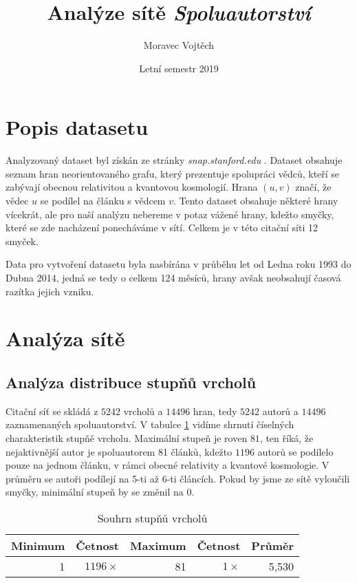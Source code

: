 \documentclass[a4paper,12pt]{article}
\author{Moravec Vojtěch}
\title{Analýze sítě \emph{Spoluautorství}}
\date{Letní semestr 2019}
\begin{document}
\maketitle
\newpage

\section{Popis datasetu}

Analyzovaný dataset byl získán ze stránky \emph{snap.stanford.edu} \cite{snapnets}. 
Dataset obsahuje seznam hran neorientovaného grafu, který prezentuje spolupráci vědců, kteří se zabývají obecnou relativitou a kvantovou kosmologií.
Hrana $(u,v)$ značí, že vědec $u$ se podílel na článku s vědcem $v$. Tento dataset obsahuje některé hrany vícekrát, ale pro naší analýzu nebereme v potaz
vážené hrany, kdežto smyčky, které se zde nacházení ponecháváme v sítí. Celkem je v této citační síti 12 smyček.

Data pro vytvoření datasetu byla nasbírána v průběhu let od Ledna roku 1993 do Dubna 2014, jedná se tedy o celkem 124 měsíců, hrany avšak neobsahují
časová razítka jejich vzniku.
 
\section{Analýza sítě}
\subsection{Analýza distribuce stupňů vrcholů}
Citační síť se skládá z $5242$ vrcholů a $14496$ hran, tedy $5242$ autorů a $14496$ zaznamenaných spoluautorství. V tabulce \ref{tab:vertexDeg} vidíme
shrnutí číselných charakteristik stupňě vrcholu. Maximální stupeň je roven $81$, ten říká, že nejaktivnější autor je spoluautorem 81 článků,
kdežto $1196$ autorů se podílelo pouze na jednom článku, v rámci obecné relativity a kvantové kosmologie. V průměru se autoři podílejí na 5-ti až 6-ti článcích.
Pokud by jsme ze sítě vyloučili smyčky, minimální stupeň by se změnil na $0$.

\begin{table}[h!]
    \centering
    \begin{tabular}{r | r | r | r | r}
        Minimum & Četnost       & Maximum   & Četnost       & Průměr \\\hline\hline
        1       & $1196 \times$ & 81        & $1 \times$    & 5,530  
    \end{tabular}
    \caption{Souhrn stupňů vrcholů}
    \label{tab:vertexDeg}
\end{table}
\end{document}
